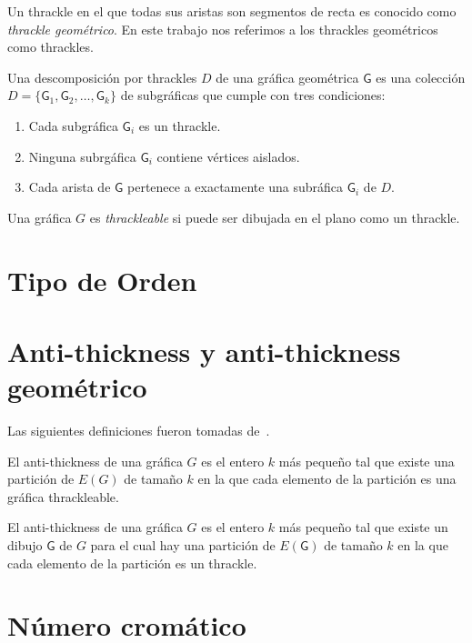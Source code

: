 Un thrackle en el que todas sus aristas son segmentos de recta es conocido como
\emph{thrackle geométrico}. En este trabajo nos referimos a los thrackles geométricos
como thrackles.

Una descomposición por thrackles $D$ de una gráfica geométrica
$\mathsf{G}$ es una colección $D=\{\mathsf{G}_1,\mathsf{G}_2,\dots,\mathsf{G}_k\}$
de subgráficas que cumple con tres condiciones:
\begin{enumerate}
  \item Cada subgráfica $\mathsf{G}_i$ es un thrackle.
  \item Ninguna subrgáfica $\mathsf{G}_i$ contiene vértices aislados.
  \item Cada arista de $\mathsf{G}$ pertenece a exactamente una subráfica $\mathsf{G}_i$ de $D$.
\end{enumerate}

Una gráfica $G$ es \emph{thrackleable} si puede ser dibujada en el plano como un thrackle.
\section{Tipo de Orden}
\section{Anti-thickness y anti-thickness geométrico}
Las siguientes definiciones fueron tomadas de~\cite{Dujmovic2017}.

El anti-thickness de una gráfica $G$ es el entero $k$ más pequeño tal que existe una
partición de $E(G)$ de tamaño $k$ en la que cada elemento de la partición
es una gráfica thrackleable.

El anti-thickness de una gráfica $G$ es el entero $k$ más pequeño tal que existe un
dibujo $\mathsf{G}$ de $G$ para el cual hay una partición de $E(\mathsf{G})$ de tamaño $k$
en la que cada elemento de la partición es un thrackle.
\section{Número cromático}
